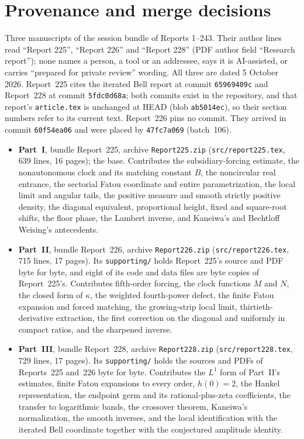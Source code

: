 \documentclass[11pt,letterpaper]{article}
\theoremstyle{remark}\newtheorem{remark}[theorem]{Remark}
\newcommand{\file}[1]{\nolinkurl{#1}}
\begin{document}
\section*{Provenance and merge decisions}\label{ied:sec:provenance}
Three manuscripts of the session bundle of Reports 1--243. Their author lines read ``Report 225'', ``Report 226'' and ``Report 228'' (PDF author field ``Research report''); none names a person, a tool or an addressee, says it is AI-assisted, or carries ``prepared for private review'' wording. All three are dated 5 October 2026. Report~225 cites the iterated Bell report at commit \texttt{65969409c} and Report~228 at commit \texttt{5fdc0d68a}; both commits exist in the repository, and that report's \file{article.tex} is unchanged at HEAD (blob \texttt{ab5014ec}), so their section numbers refer to its current text. Report~226 pins no commit. They arrived in commit \texttt{60f54ea06} and were placed by \texttt{47fc7a069} (batch~106).
\begin{itemize}
\item \textbf{Part~I}, bundle Report~225, archive \file{Report225.zip} (\file{src/report225.tex}, 639 lines, 16 pages); the base. Contributes the subsidiary-forcing estimate, the nonautonomous clock and its matching constant $B$, the noncircular real entrance, the sectorial Fatou coordinate and entire parametrization, the local limit and angular tails, the positive measure and smooth strictly positive density, the diagonal equivalent, proportional height, fixed and square-root shifts, the floor phase, the Lambert inverse, and Kaneiwa's and Bechtloff Weising's antecedents.
\item \textbf{Part~II}, bundle Report~226, archive \file{Report226.zip} (\file{src/report226.tex}, 715 lines, 17 pages). Its \file{supporting/} holds Report~225's source and PDF byte for byte, and eight of its code and data files are byte copies of Report~225's. Contributes fifth-order forcing, the clock functions $M$ and $N$, the closed form of $\kappa$, the weighted fourth-power defect, the finite Fatou expansion and forced matching, the growing-strip local limit, thirtieth-derivative extraction, the first correction on the diagonal and uniformly in compact ratios, and the sharpened inverse.
\item \textbf{Part~III}, bundle Report~228, archive \file{Report228.zip} (\file{src/report228.tex}, 729 lines, 17 pages). Its \file{supporting/} holds the sources and PDFs of Reports~225 and~226 byte for byte. Contributes the $L^1$ form of Part~II's estimates, finite Fatou expansions to every order, $h(0)=2$, the Hankel representation, the endpoint germ and its rational-plus-zeta coefficients, the transfer to logarithmic bands, the crossover theorem, Kaneiwa's normalization, the smooth inverses, and the local identification with the iterated Bell coordinate together with the conjectured amplitude identity.
\end{itemize}
\end{document}
